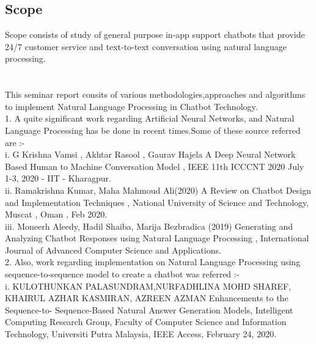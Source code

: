 \documentclass[12pt,a4paper]{report}     %
\begin{document}
\begin{normalsize}
{\section {Scope}
{\setlength{\baselineskip}{1.1\baselineskip}
Scope consists of study of general purpose in-app support chatbots that provide 24/7 customer service and text-to-text conversation using natural language processing.


\newpage 
\chapter{}
{\setlength{\baselineskip}{1.1\baselineskip}
This seminar report consits of various methodologies,approaches and algorithms to implement Natural Language Processing in Chatbot Technology. \\
1. A quite significant work regarding Artificial Neural Networks, and Natural Language Processing has be done in recent times.Some of these source referred are :- \\
\-\hspace{1cm}i. G Krishna Vamsi , Akhtar Rasool , Gaurav Hajela A Deep Neural Network Based Human to Machine Conversation Model , IEEE 11th ICCCNT 2020 July 1-3, 2020 - IIT - Kharagpur. \\
\-\hspace{1cm}ii. Ramakrishna Kumar, Maha Mahmoud Ali(2020) A Review on Chatbot Design and Implementation Techniques , National University of Science and Technology,  Muscat , Oman , Feb 2020. \\
\-\hspace{1cm}iii. Moneerh Aleedy, Hadil Shaiba, Marija Bezbradica (2019) Generating and Analyzing Chatbot Responses using Natural Language Processing , International Journal of Advanced Computer Science and Applications. \\
2. Also, work regarding implementation on Natural Language Processing using sequence-to-sequence model to create a chatbot was referred :- \\
\-\hspace{1cm}i. KULOTHUNKAN PALASUNDRAM,NURFADHLINA MOHD SHAREF, KHAIRUL
AZHAR KASMIRAN, AZREEN AZMAN Enhancements to the Sequence-to-
Sequence-Based Natural Answer Generation Models, Intelligent Computing Research
Group, Faculty of Computer Science and Information Technology, Universiti Putra
Malaysia, IEEE Access, February 24, 2020.  \\


}}}
\end{normalsize}
\end{document}
